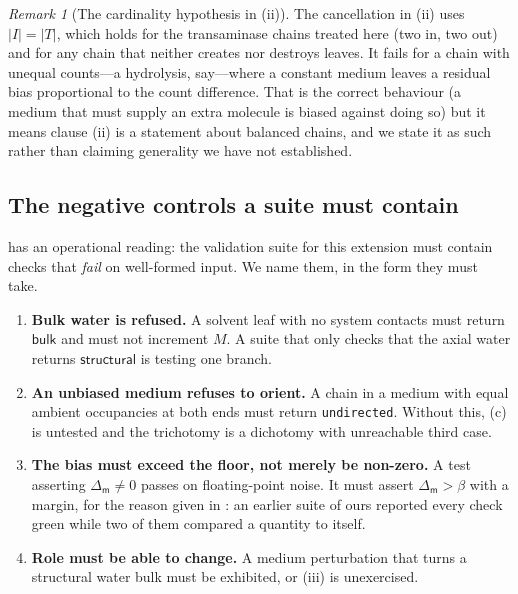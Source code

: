 \documentclass[11pt,twocolumn,a4paper]{article}
\theoremstyle{thmstyle}
\theoremstyle{definition}
\theoremstyle{remark}
\newtheorem{remark}[theorem]{Remark}
\newcommand{\flo}{\beta}
\newcommand{\med}{\mathsf{m}}
\newcommand{\shk}[1]{\texttt{#1}}
\newcommand{\abs}[1]{\lvert#1\rvert}
\newcommand{\Str}{\textsf{structural}}
\newcommand{\Blk}{\textsf{bulk}}
\begin{document}
\begin{remark}[The cardinality hypothesis in (ii)]
\label{rem:cardinality}
The cancellation in (ii) uses $\abs{I}=\abs{T}$, which holds for the
transaminase chains treated here (two in, two out) and for any chain that
neither creates nor destroys leaves. It fails for a chain with unequal
counts---a hydrolysis, say---where a constant medium leaves a residual
bias proportional to the count difference. That is the correct behaviour
(a medium that must supply an extra molecule is biased against doing so)
but it means clause (ii) is a statement about balanced chains, and we
state it as such rather than claiming generality we have not established.
\end{remark}

\subsection{The negative controls a suite must contain}

 has an operational reading: the validation suite for
this extension must contain checks that \emph{fail} on well-formed input.
We name them, in the form they must take.

\begin{enumerate}[leftmargin=1.6em,itemsep=3pt]
\item \textbf{Bulk water is refused.} A solvent leaf with no system
contacts must return $\Blk$ and must not increment $M$. A suite that only
checks that the axial water returns $\Str$ is testing one branch.
\item \textbf{An unbiased medium refuses to orient.} A chain in a medium
with equal ambient occupancies at both ends must return \shk{undirected}.
Without this, (c) is untested and the trichotomy is a
dichotomy with unreachable third case.
\item \textbf{The bias must exceed the floor, not merely be non-zero.}
A test asserting $\Delta_{\med}\neq 0$ passes on floating-point noise. It
must assert $\Delta_{\med}>\flo$ with a margin, for the reason given in
\citet{sachikonye2026pingpong}: an earlier suite of ours reported every
check green while two of them compared a quantity to itself.
\item \textbf{Role must be able to change.} A medium perturbation that
turns a structural water bulk must be exhibited, or
(iii) is unexercised.
\end{enumerate}
\end{document}
